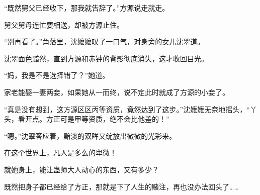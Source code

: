 \begin{this_body}
“既然舅父已经收下，那我就告辞了。”方源说走就走。

舅父舅母连忙要相送，却被方源止住。

“别再看了。”角落里，沈嬷嬷叹了一口气，对身旁的女儿沈翠道。

沈翠面色黯然，直到方源和赤钟的背影彻底消失，这才收回目光。

“妈，我是不是选择错了？”她道。

家老能娶一妻两妾，如果她从一而终，说不定此时就成了方源的小妾了。

“真是没有想到，这方源区区丙等资质，竟然达到了这步。”沈嬷嬷无奈地摇头，“丫头，看开点。方正可是甲等资质，绝不会比他差的！”

“嗯。”沈翠答应着，黯淡的双眸又绽放出微微的光彩来。

在这个世界上，凡人是多么的卑微！

就她身上，能让蛊师大人动心的东西，又有多少？

既然把身子都已经给了方正，那就是下了人生的赌注，再也没办法回头了……

\end{this_body}

